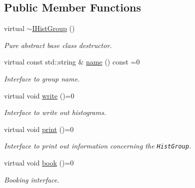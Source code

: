 \subsection*{Public Member Functions}
\begin{CompactItemize}
\item 
\hypertarget{classIHistGroup_875e5a98e6404d6070ea4a69038dc440}{
virtual \hyperlink{classIHistGroup_875e5a98e6404d6070ea4a69038dc440}{$\sim$IHist\-Group} ()}
\label{classIHistGroup_875e5a98e6404d6070ea4a69038dc440}

\begin{CompactList}\small\item\em Pure abstract base class destructor. \item\end{CompactList}\item 
\hypertarget{classIHistGroup_1bc43ad781f786fbcb5fa90df5937abb}{
virtual const std::string \& \hyperlink{classIHistGroup_1bc43ad781f786fbcb5fa90df5937abb}{name} () const =0}
\label{classIHistGroup_1bc43ad781f786fbcb5fa90df5937abb}

\begin{CompactList}\small\item\em Interface to group name. \item\end{CompactList}\item 
\hypertarget{classIHistGroup_6ce6d05d480b9335b0389f3621089bd0}{
virtual void \hyperlink{classIHistGroup_6ce6d05d480b9335b0389f3621089bd0}{write} ()=0}
\label{classIHistGroup_6ce6d05d480b9335b0389f3621089bd0}

\begin{CompactList}\small\item\em Interface to write out histograms. \item\end{CompactList}\item 
\hypertarget{classIHistGroup_b7d9ecf4e70cdea9fa8a9565134619dd}{
virtual void \hyperlink{classIHistGroup_b7d9ecf4e70cdea9fa8a9565134619dd}{print} ()=0}
\label{classIHistGroup_b7d9ecf4e70cdea9fa8a9565134619dd}

\begin{CompactList}\small\item\em Interface to print out information concerning the {\tt Hist\-Group}. \item\end{CompactList}\item 
\hypertarget{classIHistGroup_0df3bdf9480f69215a09631a9d005da2}{
virtual void \hyperlink{classIHistGroup_0df3bdf9480f69215a09631a9d005da2}{book} ()=0}
\label{classIHistGroup_0df3bdf9480f69215a09631a9d005da2}

\begin{CompactList}\small\item\em Booking interface. \item\end{CompactList}\end{CompactItemize}
